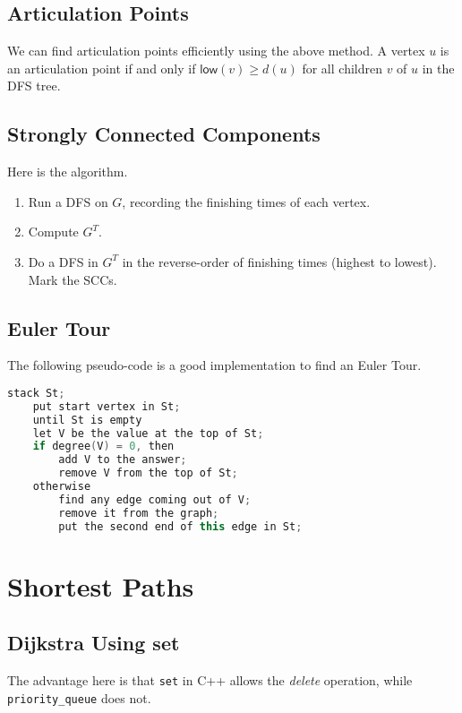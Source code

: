 \documentclass[12pt,a4paper]{amsart}
\numberwithin{equation}{section}
\theoremstyle{definition}
\begin{document}
\subsection{Articulation Points} We can find articulation points efficiently using the above method. A vertex $u$ is an articulation point if and only if $\mathsf{low}(v) \ge d(u)$ for all children $v$ of $u$ in the DFS tree.  

\subsection{Strongly Connected Components} Here is the algorithm. 

\begin{enumerate}
    \item Run a DFS on $G$, recording the finishing times of each vertex. 
    \item Compute $G^T$. 
    \item Do a DFS in $G^T$ in the reverse-order of finishing times (highest to lowest). Mark the SCCs.
\end{enumerate}

\subsection{Euler Tour} The following pseudo-code is a good implementation to find an Euler Tour.

\begin{lstlisting}[language=C++]
    stack St;
    put start vertex in St;
    until St is empty
    let V be the value at the top of St;
    if degree(V) = 0, then
        add V to the answer;
        remove V from the top of St;
    otherwise
        find any edge coming out of V;
        remove it from the graph;
        put the second end of this edge in St;
\end{lstlisting}

\section{Shortest Paths}

\subsection{Dijkstra Using set} The advantage here is that \verb|set| in C++ allows the \textit{delete} operation, while \verb|priority_queue| does not. 
\end{document}
